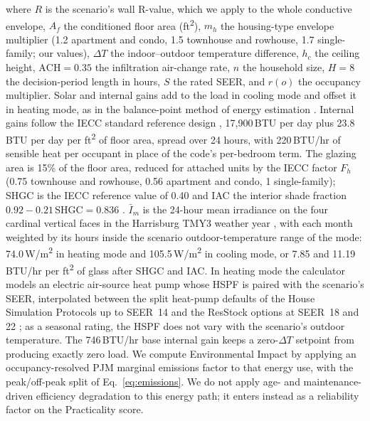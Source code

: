 \documentclass[final,3p,times]{elsarticle}
\begin{document}
\noindent where $R$ is the scenario's wall R-value, which we apply to the whole conductive envelope, $A_f$ the conditioned floor area (ft\textsuperscript{2}), $m_h$ the housing-type envelope multiplier (1.2 apartment and condo, 1.5 townhouse and rowhouse, 1.7 single-family; our values), $\Delta T$ the indoor--outdoor temperature difference, $h_c$ the ceiling height, $\mathrm{ACH}=0.35$ the infiltration air-change rate, $n$ the household size, $H=8$ the decision-period length in hours, $S$ the rated SEER, and $r(o)$ the occupancy multiplier. Solar and internal gains add to the load in cooling mode and offset it in heating mode, as in the balance-point method of energy estimation \cite{christensen1983seri}. Internal gains follow the IECC standard reference design \cite{iecc2018}, 17{,}900\,BTU per day plus 23.8\,BTU per day per ft\textsuperscript{2} of floor area, spread over 24 hours, with 220\,BTU/hr of sensible heat per occupant \cite{hendron2010hsp} in place of the code's per-bedroom term. The glazing area is 15\% of the floor area, reduced for attached units by the IECC factor $F_h$ (0.75 townhouse and rowhouse, 0.56 apartment and condo, 1 single-family); SHGC is the IECC reference value of 0.40 and IAC the interior shade fraction $0.92 - 0.21\,\mathrm{SHGC} = 0.836$ \cite{iecc2018}. $\bar{I}_m$ is the 24-hour mean irradiance on the four cardinal vertical faces in the Harrisburg TMY3 weather year \cite{onebuilding_tmy3}, with each month weighted by its hours inside the scenario outdoor-temperature range of the mode: 74.0\,W/m\textsuperscript{2} in heating mode and 105.5\,W/m\textsuperscript{2} in cooling mode, or 7.85 and 11.19\,BTU/hr per ft\textsuperscript{2} of glass after SHGC and IAC. In heating mode the calculator models an electric air-source heat pump whose HSPF is paired with the scenario's SEER, interpolated between the split heat-pump defaults of the House Simulation Protocols up to SEER~14 \cite{hendron2010hsp} and the ResStock options at SEER~18 and 22 \cite{resstock_v320}; as a seasonal rating, the HSPF does not vary with the scenario's outdoor temperature. The 746\,BTU/hr base internal gain keeps a zero-$\Delta T$ setpoint from producing exactly zero load. We compute Environmental Impact by applying an occupancy-resolved PJM marginal emissions factor to that energy use, with the peak/off-peak split of Eq.~\ref{eq:emissions}. We do not apply age- and maintenance-driven efficiency degradation to this energy path; it enters instead as a reliability factor on the Practicality score.
\end{document}
